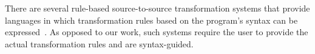 \documentclass[10pt,conference]{IEEEtran}
\begin{document}







There are several rule-based source-to-source transformation systems that provide languages in which
transformation rules based on the program's syntax can be expressed~\cite{stratego,txl}. 
As opposed to our work, such systems require the user to provide the actual transformation rules and are syntax-guided.
\end{document}
